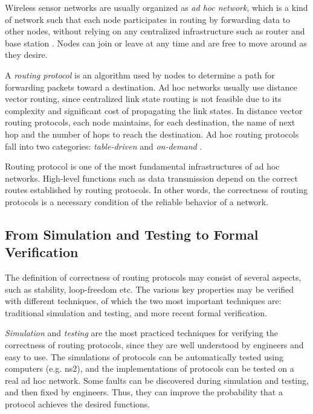 \documentclass[a4paper,10pt,twocolumn]{article}
\begin{document}
Wireless sensor networks are usually organized as \emph{ad hoc network}, which is a kind of network such that each node participates in routing by forwarding data to other nodes, without relying on any centralized infrastructure such as router and base station \cite{Per01}. Nodes can join or leave at any time and are free to move around as they desire.

A \emph{routing protocol} is an algorithm used by nodes to determine a path for forwarding packets toward a destination. Ad hoc networks usually use distance vector routing, since centralized link state routing is not feasible due to its complexity and significant cost of propagating the link states. In distance vector routing protocols, each node maintains, for each destination, the name of next hop and the number of hops to reach the destination. Ad hoc routing protocols fall into two categories: \emph{table-driven} and \emph{on-demand} \cite{RT99}.

Routing protocol is one of the most fundamental infrastructures of ad hoc networks. High-level functions such as data transmission depend on the correct routes established by routing protocols. In other words, the correctness of routing protocols is a necessary condition of the reliable behavior of a network.

\subsection{From Simulation and Testing to Formal Verification}

The definition of correctness of routing protocols may consist of several aspects, such as stability, loop-freedom etc. The various key properties may be verified with different techniques, of which the two most important techniques are: traditional simulation and testing, and more recent formal verification.

\emph{Simulation} and \emph{testing} \cite{Mye79} are the most practiced techniques for verifying the correctness of routing protocols, since they are well understood by engineers and easy to use. The simulations of protocols can be automatically tested using computers (e.g. ns2), and the implementations of protocols can be tested on a real ad hoc network. Some faults can be discovered during simulation and testing, and then fixed by engineers. Thus, they can improve the probability that a protocol achieves the desired functions.
\end{document}
